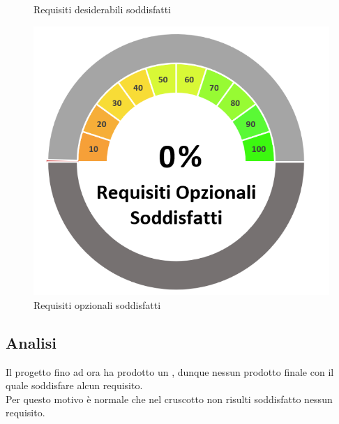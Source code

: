 \begin{figure}[H]
\begin{minipage}[b]{0.32\textwidth}
        \caption{Requisiti desiderabili soddisfatti}
        \label{reqdessodd}
    \end{minipage}
    \hfill
    \begin{minipage}[b]{0.32\textwidth}
        \centering
        \includegraphics[width=\textwidth]{ReqOpzSodd.png}
        \caption{Requisiti opzionali soddisfatti}
        \label{reqopzsodd}
    \end{minipage}
\end{figure}
\subsection{Analisi}
Il progetto fino ad ora ha prodotto un , dunque nessun prodotto finale con il quale soddisfare alcun requisito.\\Per questo motivo è normale che nel cruscotto non risulti soddisfatto nessun requisito.

